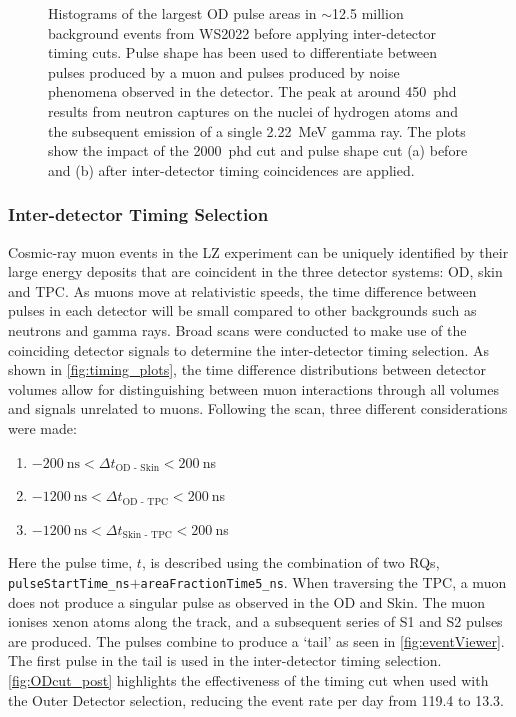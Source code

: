 \begin{figure}[htbp]
{    Histograms of the largest OD pulse areas in $\sim$12.5 million background events from WS2022 before applying inter-detector timing cuts. Pulse shape has been used to differentiate between pulses produced by a muon and pulses produced by noise phenomena observed in the detector. The peak at around 450~phd results from neutron captures on the nuclei of hydrogen atoms and the subsequent emission of a single 2.22~MeV gamma ray. The plots show the impact of the 2000~phd cut and pulse shape cut (a) before and (b) after inter-detector timing coincidences are applied.}%
    \label{fig:ODSpectra}
\end{figure}

\subsubsection{Inter-detector Timing Selection}
Cosmic-ray muon events in the LZ experiment can be uniquely identified by their large energy deposits that are coincident in the three detector systems: OD, skin and TPC. As muons move at relativistic speeds, the time difference between pulses in each detector will be small compared to other backgrounds such as neutrons and gamma rays.
Broad scans were conducted to make use of the coinciding detector signals to determine the inter-detector timing selection. As shown in \autoref{fig:timing_plots}, the time difference distributions between detector volumes allow for distinguishing between muon interactions through all volumes and signals unrelated to muons. Following the scan, three different considerations were made:
 \begin{enumerate}
    \item $-200~\text{ns} < \Delta t_{\text{OD - Skin}} < 200~$ns
    \item $-1200~\text{ns} < \Delta t_{\text{OD - TPC}} < 200~$ns
    \item $-1200~\text{ns} < \Delta t_{\text{Skin - TPC}} < 200~$ns
\end{enumerate}
Here the pulse time, $t$, is described using the combination of two RQs, \texttt{pulseStartTime\_ns$+$areaFractionTime5\_ns}. When traversing the TPC, a muon does not produce a singular pulse as observed in the OD and Skin. The muon ionises xenon atoms along the track, and a subsequent series of S1 and S2 pulses are produced. The pulses combine to produce a `tail' as seen in \autoref{fig:eventViewer}. The first pulse in the tail is used in the inter-detector timing selection. \autoref{fig:ODcut_post} highlights the effectiveness of the timing cut when used with the Outer Detector selection, reducing the event rate per day from 119.4 to 13.3.

